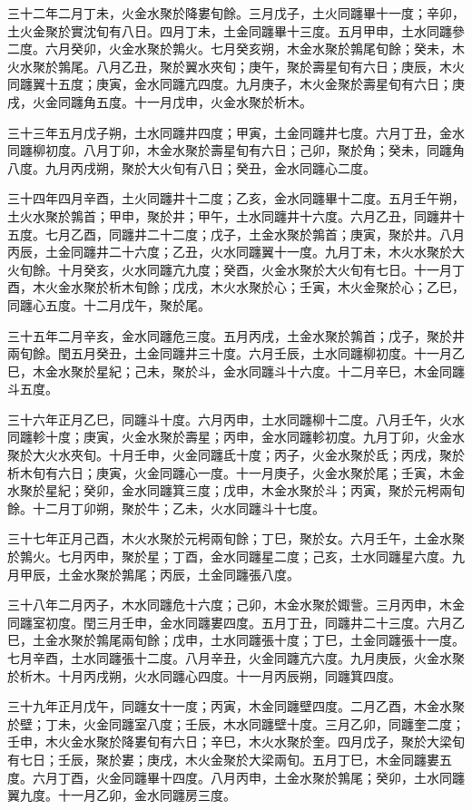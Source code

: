 \begin{pinyinscope}
三十二年二月丁未，火金水聚於降婁旬餘。三月戊子，土火同躔畢十一度；辛卯，土火金聚於實沈旬有八日。四月丁未，土金同躔畢十三度。五月甲申，土水同躔參二度。六月癸卯，火金水聚於鶉火。七月癸亥朔，木金水聚於鶉尾旬餘；癸未，木火水聚於鶉尾。八月乙丑，聚於翼水夾旬；庚午，聚於壽星旬有六日；庚辰，木火同躔翼十五度；庚寅，金水同躔亢四度。九月庚子，木火金聚於壽星旬有六日；庚戌，火金同躔角五度。十一月戊申，火金水聚於析木。

三十三年五月戊子朔，土水同躔井四度；甲寅，土金同躔井七度。六月丁丑，金水同躔柳初度。八月丁卯，木金水聚於壽星旬有六日；己卯，聚於角；癸未，同躔角八度。九月丙戌朔，聚於大火旬有八日；癸丑，金水同躔心二度。

三十四年四月辛酉，土火同躔井十二度；乙亥，金水同躔畢十二度。五月壬午朔，土火水聚於鶉首；甲申，聚於井；甲午，土水同躔井十六度。六月乙丑，同躔井十五度。七月乙酉，同躔井二十二度；戊子，土金水聚於鶉首；庚寅，聚於井。八月丙辰，土金同躔井二十六度；乙丑，火水同躔翼十一度。九月丁未，木火水聚於大火旬餘。十月癸亥，火水同躔亢九度；癸酉，火金水聚於大火旬有七日。十一月丁酉，木火金水聚於析木旬餘；戊戌，木火水聚於心；壬寅，木火金聚於心；乙巳，同躔心五度。十二月戊午，聚於尾。

三十五年二月辛亥，金水同躔危三度。五月丙戌，土金水聚於鶉首；戊子，聚於井兩旬餘。閏五月癸丑，土金同躔井三十度。六月壬辰，土水同躔柳初度。十一月乙巳，木金水聚於星紀；己未，聚於斗，金水同躔斗十六度。十二月辛巳，木金同躔斗五度。

三十六年正月乙巳，同躔斗十度。六月丙申，土水同躔柳十二度。八月壬午，火水同躔軫十度；庚寅，火金水聚於壽星；丙申，金水同躔軫初度。九月丁卯，火金水聚於大火水夾旬。十月壬申，火金同躔氐十度；丙子，火金水聚於氐；丙戌，聚於析木旬有六日；庚寅，火金同躔心一度。十一月庚子，火金水聚於尾；壬寅，木金水聚於星紀；癸卯，金水同躔箕三度；戊申，木金水聚於斗；丙寅，聚於元枵兩旬餘。十二月丁卯朔，聚於牛；乙未，火水同躔斗十七度。

三十七年正月己酉，木火水聚於元枵兩旬餘；丁巳，聚於女。六月壬午，土金水聚於鶉火。七月丙申，聚於星；丁酉，金水同躔星二度；己亥，土水同躔星六度。九月甲辰，土金水聚於鶉尾；丙辰，土金同躔張八度。

三十八年二月丙子，木水同躔危十六度；己卯，木金水聚於娵訾。三月丙申，木金同躔室初度。閏三月壬申，金水同躔婁四度。五月丁丑，同躔井二十三度。六月乙巳，土金水聚於鶉尾兩旬餘；戊申，土水同躔張十度；丁巳，土金同躔張十一度。七月辛酉，土水同躔張十二度。八月辛丑，火金同躔亢六度。九月庚辰，火金水聚於析木。十月丙戌朔，火水同躔心四度。十一月丙辰朔，同躔箕四度。

三十九年正月戊午，同躔女十一度；丙寅，木金同躔壁四度。二月乙酉，木金水聚於壁；丁未，火金同躔室八度；壬辰，木水同躔壁十度。三月乙卯，同躔奎二度；壬申，木火金水聚於降婁旬有六日；辛巳，木火水聚於奎。四月戊子，聚於大梁旬有七日；壬辰，聚於婁；庚戌，木火金聚於大梁兩旬。五月丁巳，木金同躔婁五度。六月丁酉，火金同躔畢十四度。八月丙申，土金水聚於鶉尾；癸卯，土水同躔翼九度。十一月乙卯，金水同躔房三度。


\end{pinyinscope}
